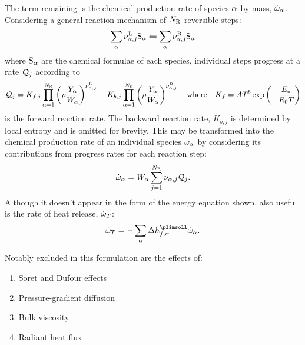 The term remaining is the chemical production rate of species $\a$ by mass, $\dot{\w}_\a$. Considering a general reaction mechanism of $N_{\rm{R}}$ reversible steps:
\begin{equation}
\sum_\a \nu_{\a, j}^{\rm{L}} \rm{S}_\a \leftrightharpoons \sum_\a \nu_{\a, j}^{\rm{R}} \rm{S}_\a
\end{equation}
where $\rm{S}_\a$ are the chemical formulae of each species, individual steps progress at a rate $\cl{Q}_j$ according to
\begin{equation}
\cl{Q}_j = K_{f, j}\prod_{\a = 1}^{N_{\rm{S}}} \left(\r \frac{Y_\a}{W_\a}\right)^{\nu_{\a, j}^{\rm{L}}} - K_{b, j}\prod_{\a = 1}^{N_{\rm{S}}} \left(\r \frac{Y_\a}{W_\a}\right)^{\nu_{\a, j}^{\rm{R}}}
\quad \text{where} \quad
K_{f} = A T^b \exp\left(-\frac{E_a}{R_0 T}\right)
\end{equation}
is the forward reaction rate. The backward reaction rate, $K_{b, j}$ is determined by local entropy and is omitted for brevity. This may be transformed into the chemical production rate of an individual species $\dot{\w}_\a$ by considering its contributions from progress rates for each reaction step:
\begin{equation}
\dot{\w}_\a = W_\a \sum_{j = 1}^{N_\rm{R}} \nu_{\a, j} \cl{Q}_j.
\end{equation}
Although it doesn't appear in the form of the energy equation shown, also useful is the rate of heat release, $\dot{\w}_T$:
\begin{equation}
\dot{\w}_T = -\sum_\a \D h_{f, \a}^\plimsoll \dot{\w}_\a.
\end{equation}

Notably excluded in this formulation \cite{williams1985CombustionTheory} are the effects of:
\begin{enumerate}
\item Soret \cite{soret1879LetatDequilibreQue} and Dufour \cite{dufour1872DiffusionThermoeffect} effects
\item Pressure-gradient diffusion
\item Bulk viscosity \cite{buresti2015NoteStokesHypothesis}
\item Radiant heat flux
\end{enumerate}





